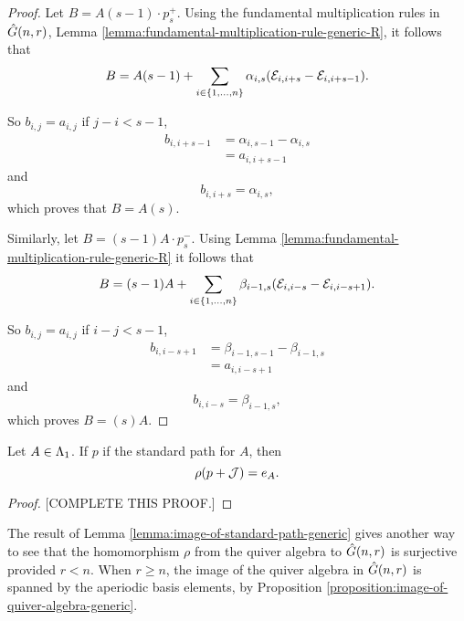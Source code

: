 \documentclass[a4paper, 11pt]{report}
\begin{document}
\begin{proof}
Let $B=A(s-1)\cdot p_s^+$. Using the fundamental multiplication rules in $\hat{G}(n,r)$, Lemma \ref{lemma:fundamental-multiplication-rule-generic-R}, it follows that
\begin{equation*}
B = A(s-1) + \sum_{i\in\{1,\ldots,n\}} \alpha_{i,s}(\mathcal{E}_{i,i+s} -\mathcal{E}_{i,i+s-1}).
\end{equation*}

So $b_{i,j}=a_{i,j}$ if $j-i<s-1$,
\begin{align*}
b_{i,i+s-1}
&= \alpha_{i,s-1}-\alpha_{i,s}\\
&= a_{i,i+s-1}
\end{align*}
and
\begin{equation*}
b_{i,i+s} = \alpha_{i,s},
\end{equation*}
which proves that $B=A(s)$.

Similarly, let $B=(s-1)A\cdot p_s^-$. Using Lemma \ref{lemma:fundamental-multiplication-rule-generic-R} it follows that
\begin{equation*}
B = (s-1)A + \sum_{i\in\{1,\ldots,n\}} \beta_{i-1,s}(\mathcal{E}_{i,i-s} - \mathcal{E}_{i,i-s+1}).
\end{equation*}

So $b_{i,j}=a_{i,j}$ if $i-j<s-1$,
\begin{align*}
b_{i,i-s+1}
&= \beta_{i-1,s-1} - \beta_{i-1,s}\\
&= a_{i,i-s+1}
\end{align*}
and
\begin{equation*}
b_{i,i-s} = \beta_{i-1,s},
\end{equation*}
which proves $B=(s)A$.
\end{proof}


\begin{lemma}\label{lemma:image-of-standard-path-generic}
Let $A\in\Lambda_1{}$. If $p$ if the standard path for $A$, then
\begin{equation*}
\rho(p+\mathcal{J}) = e_A.
\end{equation*}
\end{lemma}

\begin{proof}
{\color{red}[COMPLETE THIS PROOF.]}
\end{proof}

\begin{remark}
The result of Lemma \ref{lemma:image-of-standard-path-generic} gives another way to see that the homomorphism $\rho$ from the quiver algebra to $\hat{G}(n,r)$ is surjective provided $r<n$. When $r\geq n$, the image of the quiver algebra in $\hat{G}(n,r)$ is spanned by the aperiodic basis elements, by Proposition \ref{proposition:image-of-quiver-algebra-generic}.
\end{remark}
\end{document}
